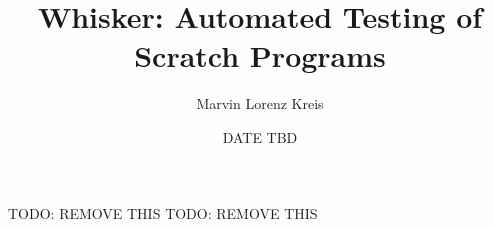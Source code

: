 \documentclass[12pt,a4paper,twoside]{report}
\title{Whisker: Automated Testing of Scratch Programs}
\author{Marvin Lorenz Kreis}
\date{DATE TBD}
\begin{document}



\maketitle


\tableofcontents
\clearpage

\listoffigures





%














TODO: REMOVE THIS
\label{TODO}
TODO: REMOVE THIS

\clearpage
%


\end{document}
